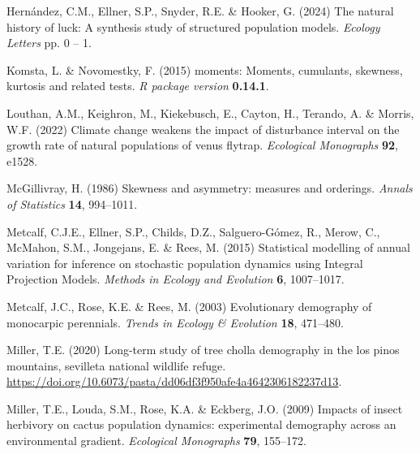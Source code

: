 \documentclass[12pt]{article}
\begin{document}
\begin{spacing}{1.9}
\begin{thebibliography}{62}
Hern\'{a}ndez, C.M., Ellner, S.P., Snyder, R.E. \& Hooker, G. (2024) The
  natural history of luck: A synthesis study of structured population models.
  \emph{Ecology Letters} pp. 0 -- 1.

Komsta, L. \& Novomestky, F. (2015) moments: Moments, cumulants, skewness,
  kurtosis and related tests. \emph{R package version} \textbf{0.14.1}.

Louthan, A.M., Keighron, M., Kiekebusch, E., Cayton, H., Terando, A. \& Morris,
  W.F. (2022) Climate change weakens the impact of disturbance interval on the
  growth rate of natural populations of venus flytrap. \emph{Ecological
  Monographs} \textbf{92}, e1528.

McGillivray, H. (1986) Skewness and asymmetry: measures and orderings.
  \emph{Annals of Statistics} \textbf{14}, 994--1011.

Metcalf, C.J.E., Ellner, S.P., Childs, D.Z., Salguero-G{\'o}mez, R., Merow, C.,
  McMahon, S.M., Jongejans, E. \& Rees, M. (2015) {S}tatistical modelling of
  annual variation for inference on stochastic population dynamics using
  {I}ntegral {P}rojection {M}odels. \emph{Methods in Ecology and Evolution}
  \textbf{6}, 1007--1017.

Metcalf, J.C., Rose, K.E. \& Rees, M. (2003) Evolutionary demography of
  monocarpic perennials. \emph{Trends in Ecology \& Evolution} \textbf{18},
  471--480.

Miller, T.E. (2020) Long-term study of tree cholla demography in the los pinos
  mountains, sevilleta national wildlife refuge.
  \url{https://doi.org/10.6073/pasta/dd06df3f950afe4a4642306182237d13}.

Miller, T.E., Louda, S.M., Rose, K.A. \& Eckberg, J.O. (2009) Impacts of insect
  herbivory on cactus population dynamics: experimental demography across an
  environmental gradient. \emph{Ecological Monographs} \textbf{79}, 155--172.


\end{thebibliography}
\end{spacing}
\end{document}
